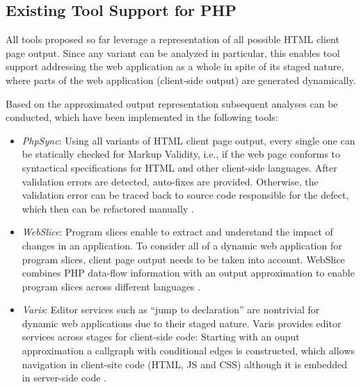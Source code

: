 \documentclass[sigconf]{acmart}
\begin{document}
\subsection{Existing Tool Support for PHP}\label{sec:existing_tools}
All tools proposed so far leverage a representation of all possible HTML client
page output. Since any variant can be analyzed in particular, this enables tool
support addressing the web application as a whole in spite of its staged
nature, where parts of the web application (client-side output) are generated
dynamically.

Based on the approximated output representation subsequent analyses can be
conducted, which have been implemented in the following tools:
\begin{itemize}
	\item {\emph{PhpSync}: Using all variants of  HTML client page output, every
	single one can be statically checked for Markup Validity, i.e., if the web page
	conforms to syntactical specifications for HTML and other client-side
	languages. After validation errors are detected, auto-fixes are provided.
	Otherwise, the validation error can be traced back to source code responsible
	for the defect, which then can be refactored manually
	\cite{Nguyen:2011:AFH:2190078.2190142}. }

	\item \emph{WebSlice}: Program slices enable to extract and understand the
	impact of changes in an application. To consider all of a dynamic web
	application for program slices, client page output needs to be taken into
	account. WebSlice combines PHP data-flow information with an output
	approximation to enable program slices across different languages
	\cite{Nguyen:2015:CPS:2786805.2786872}.

	\item \emph{Varis}: Editor services such as “jump to declaration” are
	nontrivial for dynamic web applications due to their staged nature. Varis
	provides editor services across stages for client-side code: Starting with an
	ouput approximation a callgraph with conditional edges is constructed, which
	allows navigation in client-site code (HTML, JS and CSS) although it is
	embedded in server-side code
	\cite{Nguyen:2015:VIS:2819009.2819140,Nguyen:2014:BCG:2635868.2635928}.
\end{itemize}
\end{document}
